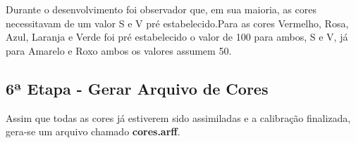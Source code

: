 Durante o desenvolvimento foi observador que, em sua maioria, as cores necessitavam de um valor S e V pré estabelecido.Para as cores Vermelho, Rosa, Azul, Laranja e Verde foi pré estabelecido o valor de 100 para ambos, S e V, já para Amarelo e Roxo ambos os valores assumem 50.


  \subsection{6ª Etapa - Gerar Arquivo de Cores}
  Assim que todas as cores já estiverem sido assimiladas e a calibração finalizada, gera-se um arquivo chamado \textbf{cores.arff}. 
  
  		
  
  
  

 
 
